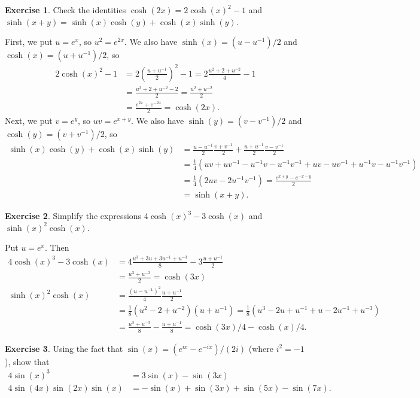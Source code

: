 \documentclass[a4paper]{amsart}
\theoremstyle{definition}
\newtheorem{exercise}{Exercise}[section]
\newenvironment{solution}{{\noindent \bf Solution:}}{}
\begin{document}
\begin{exercise}\label{ex-hyp-ident}
Check the identities $\cosh(2x)=2\cosh(x)^2-1$ and
 $\sinh(x+y)=\sinh(x)\cosh(y)+\cosh(x)\sinh(y)$.
\end{exercise}
\begin{solution}
First, we put $u=e^x$, so $u^2=e^{2x}$.  We also have
 $\sinh(x)=(u-u^{-1})/2$ and $\cosh(x)=(u+u^{-1})/2$, so
 \begin{align*}
  2\cosh(x)^2-1 &= 2\left(\frac{u+u^{-1}}{2}\right)^2 - 1
    = 2\frac{u^2 + 2 + u^{-2}}{4} - 1 \\
   &= \frac{u^2 + {2} + u^{-2} - {2}}{2} 
    = \frac{u^2+u^{-2}}{2} \\
   &= \frac{e^{2x} + e^{-2x}}{2} = \cosh(2x).
 \end{align*}
 Next, we put $v=e^y$, so $uv=e^{x+y}$.  We also have
 $\sinh(y)=(v-v^{-1})/2$ and $\cosh(y)=(v+v^{-1})/2$, so
 \begin{align*}
  \sinh(x)\cosh(y)+\cosh(x)\sinh(y) &= 
   \frac{u-u^{-1}}{2} \frac{v+v^{-1}}{2} + 
   \frac{u+u^{-1}}{2} \frac{v-v^{-1}}{2} \\
  &= \frac{1}{4}\left(
      uv + {uv^{-1}} - {u^{-1}v} - u^{-1}v^{-1} +
      uv - {uv^{-1}} + {u^{-1}v} - u^{-1}v^{-1}
     \right) \\
  &= \frac{1}{4}(2uv - 2u^{-1}v^{-1}) = \frac{e^{x+y}-e^{-x-y}}{2} \\
  &= \sinh(x+y).
 \end{align*}
\end{solution}
\begin{exercise}\label{ex-hyp-simp}
Simplify the expressions $4\cosh(x)^3-3\cosh(x)$ and
 $\sinh(x)^2\cosh(x)$.
\end{exercise}
\begin{solution}
Put $u=e^x$.  Then
 \begin{align*}
  4\cosh(x)^3-3\cosh(x)
   &= 4\frac{u^3+3u+3u^{-1}+u^{-3}}{8} - 3\frac{u+u^{-1}}{2}
   \\
   &= \frac{u^3+u^{-3}}{2} = \cosh(3x) \\
  \sinh(x)^2\cosh(x)
   &= \frac{(u-u^{-1})^2}{4} \frac{u+u^{-1}}{2} \\
   &= \frac{1}{8}(u^2-2+u^{-2})(u+u^{-1}) 
    = \frac{1}{8}(u^3-2u+u^{-1}+u-2u^{-1}+u^{-3}) \\ 
   &= \frac{u^3+u^{-3}}{8} - \frac{u+u^{-1}}{8} 
    = \cosh(3x)/4 - \cosh(x)/4. 
 \end{align*}
\end{solution}
\begin{exercise}\label{ex-trig-ident}
Using the fact that $\sin(x)=(e^{ix}-e^{-ix})/(2i)$ (where
 $i^2=-1$), show that 
 \begin{align*}
  4\sin(x)^3 &= 3\sin(x)-\sin(3x) \\
  4\sin(4x)\sin(2x)\sin(x) &=
     -\sin(x) + \sin(3x) + \sin(5x) - \sin(7x).
 \end{align*}
\end{exercise}
\end{document}
